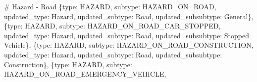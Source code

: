 \documentclass[
  letterpaper,
  DIV=11,
  numbers=noendperiod]{scrartcl}
\newenvironment{Shaded}{\begin{snugshade}}{\end{snugshade}}
\newcommand{\CommentTok}[1]{\textcolor[rgb]{0.37,0.37,0.37}{#1}}
\newcommand{\NormalTok}[1]{\textcolor[rgb]{0.00,0.23,0.31}{#1}}
\newcommand{\StringTok}[1]{\textcolor[rgb]{0.13,0.47,0.30}{#1}}
\begin{document}
\begin{Shaded}
\begin{Highlighting}[]
    \CommentTok{\# Hazard {-} Road}
\NormalTok{    \{}\StringTok{\textquotesingle{}type\textquotesingle{}}\NormalTok{: }\StringTok{\textquotesingle{}HAZARD\textquotesingle{}}\NormalTok{, }\StringTok{\textquotesingle{}subtype\textquotesingle{}}\NormalTok{: }\StringTok{\textquotesingle{}HAZARD\_ON\_ROAD\textquotesingle{}}\NormalTok{, }
     \StringTok{\textquotesingle{}updated\_type\textquotesingle{}}\NormalTok{: }\StringTok{\textquotesingle{}Hazard\textquotesingle{}}\NormalTok{, }\StringTok{\textquotesingle{}updated\_subtype\textquotesingle{}}\NormalTok{: }\StringTok{\textquotesingle{}Road\textquotesingle{}}\NormalTok{, }\StringTok{\textquotesingle{}updated\_subsubtype\textquotesingle{}}\NormalTok{: }\StringTok{\textquotesingle{}General\textquotesingle{}}\NormalTok{\},}
\NormalTok{    \{}\StringTok{\textquotesingle{}type\textquotesingle{}}\NormalTok{: }\StringTok{\textquotesingle{}HAZARD\textquotesingle{}}\NormalTok{, }\StringTok{\textquotesingle{}subtype\textquotesingle{}}\NormalTok{: }\StringTok{\textquotesingle{}HAZARD\_ON\_ROAD\_CAR\_STOPPED\textquotesingle{}}\NormalTok{, }
     \StringTok{\textquotesingle{}updated\_type\textquotesingle{}}\NormalTok{: }\StringTok{\textquotesingle{}Hazard\textquotesingle{}}\NormalTok{, }\StringTok{\textquotesingle{}updated\_subtype\textquotesingle{}}\NormalTok{: }\StringTok{\textquotesingle{}Road\textquotesingle{}}\NormalTok{, }\StringTok{\textquotesingle{}updated\_subsubtype\textquotesingle{}}\NormalTok{: }\StringTok{\textquotesingle{}Stopped Vehicle\textquotesingle{}}\NormalTok{\},}
\NormalTok{    \{}\StringTok{\textquotesingle{}type\textquotesingle{}}\NormalTok{: }\StringTok{\textquotesingle{}HAZARD\textquotesingle{}}\NormalTok{, }\StringTok{\textquotesingle{}subtype\textquotesingle{}}\NormalTok{: }\StringTok{\textquotesingle{}HAZARD\_ON\_ROAD\_CONSTRUCTION\textquotesingle{}}\NormalTok{, }
     \StringTok{\textquotesingle{}updated\_type\textquotesingle{}}\NormalTok{: }\StringTok{\textquotesingle{}Hazard\textquotesingle{}}\NormalTok{, }\StringTok{\textquotesingle{}updated\_subtype\textquotesingle{}}\NormalTok{: }\StringTok{\textquotesingle{}Road\textquotesingle{}}\NormalTok{, }\StringTok{\textquotesingle{}updated\_subsubtype\textquotesingle{}}\NormalTok{: }\StringTok{\textquotesingle{}Construction\textquotesingle{}}\NormalTok{\},}
\NormalTok{    \{}\StringTok{\textquotesingle{}type\textquotesingle{}}\NormalTok{: }\StringTok{\textquotesingle{}HAZARD\textquotesingle{}}\NormalTok{, }\StringTok{\textquotesingle{}subtype\textquotesingle{}}\NormalTok{: }\StringTok{\textquotesingle{}HAZARD\_ON\_ROAD\_EMERGENCY\_VEHICLE\textquotesingle{}}\NormalTok{, }

\end{Highlighting}
\end{Shaded}
\end{document}
